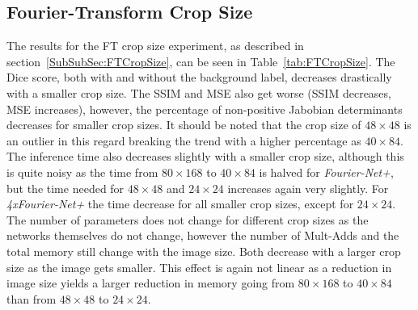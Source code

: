 \subsection{Fourier-Transform Crop Size} \label{SubSec:ResultsFTCropSize}
The results for the FT crop size experiment, as described in section~\ref{SubSubSec:FTCropSize}, can be seen in Table~\ref{tab:FTCropSize}. The Dice score, both with and without the background label, decreases drastically with a smaller crop size. The SSIM and MSE also get worse (SSIM decreases, MSE increases), however, the percentage of non-positive Jabobian determinants decreases for smaller crop sizes. It should be noted that the crop size of $48 \times 48$ is an outlier in this regard breaking the trend with a higher percentage as $40 \times 84$. The inference time also decreases slightly with a smaller crop size, although this is quite noisy as the time from $80 \times 168$ to $40 \times 84$ is halved for \emph{Fourier-Net+}, but the time needed for $48 \times 48$ and $24 \times 24$ increases again very slightly. For \emph{4xFourier-Net+} the time decrease for all smaller crop sizes, except for $24 \times 24$. The number of parameters does not change for different crop sizes as the networks themselves do not change, however the number of Mult-Adds and the total memory still change with the image size. Both decrease with a larger crop size as the image gets smaller. This effect is again not linear as a reduction in image size yields a larger reduction in memory going from $80 \times 168$ to $40 \times 84$ than from $48 \times 48$ to $24 \times 24$. 

